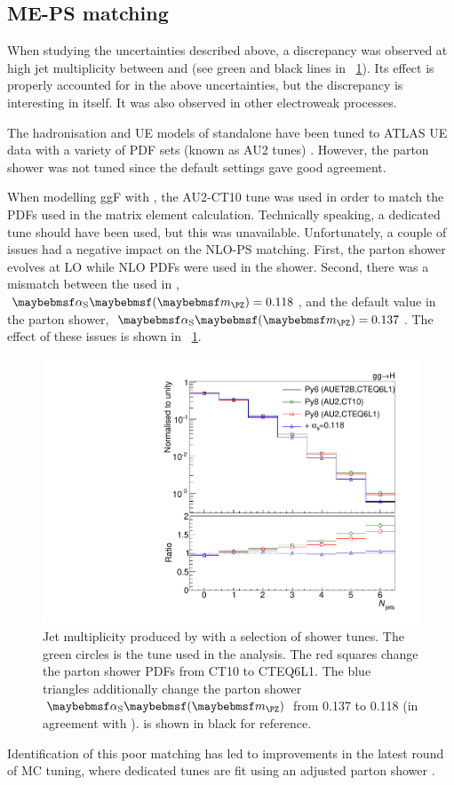 \subsection{ME-PS matching}
\label{sec:ggF:meps_matching}

When studying the uncertainties described above, a discrepancy was observed at high jet 
multiplicity between  and  (see 
green and black lines in \Figure~\ref{fig:signal:matching}). Its effect is properly 
accounted for in the above uncertainties, but the discrepancy is interesting in itself.
It was also observed in other electroweak processes.

The hadronisation and UE models of standalone  have been tuned to ATLAS 
UE data with a variety of PDF sets (known as AU2 tunes) \cite{ATLAS:tune:2012}.
However, the parton shower was not tuned since the default settings gave good agreement. 

When modelling ggF with \powhegbox, the AU2-CT10 tune was used in order to match the 
PDFs used in the matrix element calculation. Technically speaking, a dedicated 
 tune should have been used, but this was unavailable. 
Unfortunately, a couple of issues had a negative impact on the NLO-PS matching. First, 
the parton shower evolves \alphaS at LO while NLO PDFs were used in the shower. 
Second, there was a mismatch between the \alphaS used in \powhegbox, 
$\alphaS\parenths{\mZ} = 0.118$, and the default value in the parton shower, 
$\alphaS\parenths{\mZ} = 0.137$. The effect of these issues is shown in 
\Figure~\ref{fig:signal:matching}.

\begin{figure}
	\includegraphics[width=\smallfigwidth]{tex/signal/matching}
	\caption{Jet multiplicity produced by  with a selection 
	of shower tunes. The green circles is the tune used in the analysis. The red squares 
	change the parton shower PDFs from CT10 to CTEQ6L1. The blue triangles additionally 
	change the parton shower $\alphaS\parenths{\mZ}$ from 0.137 to 0.118 (in agreement 
	with \powhegbox).  is shown in black for reference.}
	\label{fig:signal:matching}
\end{figure}

Identification of this poor matching has led to improvements in the latest round of MC 
tuning, where dedicated  tunes are fit using an adjusted 
parton shower \cite{ATLAS:tune:2013}.
